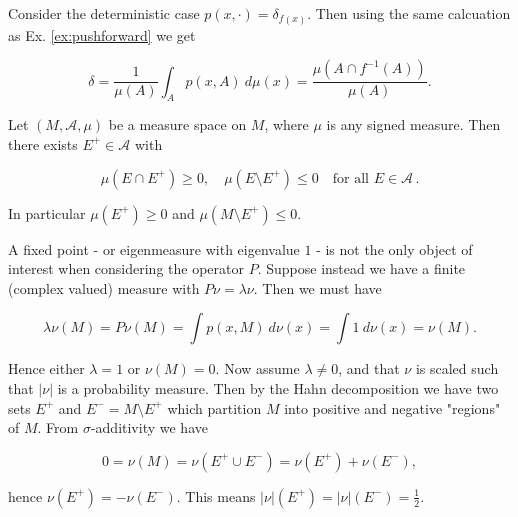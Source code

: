 \begin{example}
    \cite*{attr}
    Consider the deterministic case $p(x, \cdot) = \delta_{f(x)}$. Then using the same 
    calcuation as Ex. \ref{ex:pushforward} we get 

    \begin{equation}
        \delta = \frac{1}{\mu (A)} \int_A p(x, A)\ d\mu (x) 
        = \frac{\mu (A \cap f^{-1} (A))}{\mu (A)}. 
    \end{equation}

\end{example}

\begin{theorem}
    \cite*{funcana}
    Let $(M, \mathcal{A}, \mu)$ be a measure space on $M$, where $\mu$ is any signed 
    measure. Then there exists $E^+ \in \mathcal{A}$ with 

    \begin{equation}
        \mu (E \cap E^+) \geq 0, \quad \mu (E \setminus E^+) \leq 0 \quad
        \text{for all } E \in \mathcal{A}\,.
    \end{equation}

    In particular $\mu (E^+) \geq 0$ and $\mu (M \setminus E^+) \leq 0$.
\end{theorem}

A fixed point - or eigenmeasure with eigenvalue $1$ - is not the only object of interest 
when considering the operator $P$. Suppose instead we have a
finite (complex valued) measure with $P \nu = \lambda \nu$. Then
we must have 

\begin{equation}
    \lambda \nu (M) = P \nu (M) = \int p(x, M)\ d\nu (x) = \int 1\ d\nu (x) = \nu (M).
\end{equation}

Hence either $\lambda = 1$ or $\nu (M) = 0$. Now assume $\lambda \neq 0$, and that $\nu$ 
is scaled such that $| \nu |$ is a probability measure. Then by the Hahn decomposition we 
have two sets $E^+$ and $E^- = M \setminus E^+$ which partition $M$ into positive and 
negative "regions" of $M$. From $\sigma$-additivity we have

\begin{equation}
    0 = \nu (M) = \nu (E^+ \cup E^-) = \nu (E^+) + \nu (E^-),
\end{equation}

hence $\nu (E^+) = - \nu (E^-)$. This means $| \nu | (E^+) = | \nu | (E^-) = \frac{1}{2}$. \\

